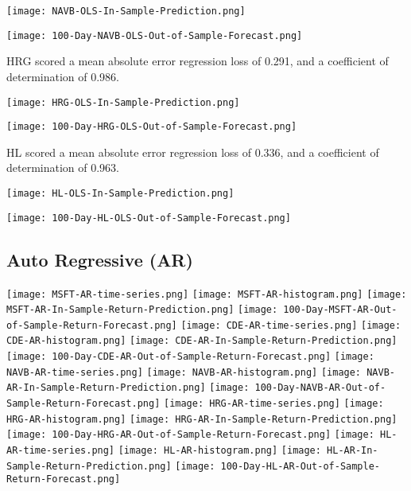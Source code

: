 \texttt{[image: NAVB-OLS-In-Sample-Prediction.png]}

\texttt{[image: 100-Day-NAVB-OLS-Out-of-Sample-Forecast.png]}

HRG scored a mean absolute error regression loss of 0.291, and a coefficient of determination of 0.986.

\texttt{[image: HRG-OLS-In-Sample-Prediction.png]}

\texttt{[image: 100-Day-HRG-OLS-Out-of-Sample-Forecast.png]}

HL scored a mean absolute error regression loss of 0.336, and a coefficient of determination of 0.963.

\texttt{[image: HL-OLS-In-Sample-Prediction.png]}

\texttt{[image: 100-Day-HL-OLS-Out-of-Sample-Forecast.png]}

\subsection{Auto Regressive (AR)}
\texttt{[image: MSFT-AR-time-series.png]}
\texttt{[image: MSFT-AR-histogram.png]}
\texttt{[image: MSFT-AR-In-Sample-Return-Prediction.png]}
\texttt{[image: 100-Day-MSFT-AR-Out-of-Sample-Return-Forecast.png]}
\texttt{[image: CDE-AR-time-series.png]}
\texttt{[image: CDE-AR-histogram.png]}
\texttt{[image: CDE-AR-In-Sample-Return-Prediction.png]}
\texttt{[image: 100-Day-CDE-AR-Out-of-Sample-Return-Forecast.png]}
\texttt{[image: NAVB-AR-time-series.png]}
\texttt{[image: NAVB-AR-histogram.png]}
\texttt{[image: NAVB-AR-In-Sample-Return-Prediction.png]}
\texttt{[image: 100-Day-NAVB-AR-Out-of-Sample-Return-Forecast.png]}
\texttt{[image: HRG-AR-time-series.png]}
\texttt{[image: HRG-AR-histogram.png]}
\texttt{[image: HRG-AR-In-Sample-Return-Prediction.png]}
\texttt{[image: 100-Day-HRG-AR-Out-of-Sample-Return-Forecast.png]}
\texttt{[image: HL-AR-time-series.png]}
\texttt{[image: HL-AR-histogram.png]}
\texttt{[image: HL-AR-In-Sample-Return-Prediction.png]}
\texttt{[image: 100-Day-HL-AR-Out-of-Sample-Return-Forecast.png]}

